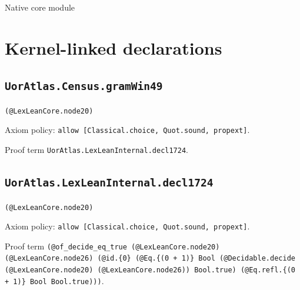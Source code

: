 \documentclass[11pt]{article}
\begin{document}
\begin{center}{\LARGE Native core module}\end{center}
\section*{Kernel-linked declarations}
\subsection*{\texttt{UorAtlas.Census.gramWin49}}
\noindent\texttt{(@LexLeanCore.node20)}\par
\noindent Axiom policy: \texttt{allow [Classical.choice, Quot.sound, propext]}.\par
\noindent Proof term \texttt{UorAtlas.LexLeanInternal.decl1724}.\par
\subsection*{\texttt{UorAtlas.LexLeanInternal.decl1724}}
\noindent\texttt{(@LexLeanCore.node20)}\par
\noindent Axiom policy: \texttt{allow [Classical.choice, Quot.sound, propext]}.\par
\noindent Proof term \texttt{(@of\_decide\_eq\_true (@LexLeanCore.node20) (@LexLeanCore.node26) (@id.\{0\} (@Eq.\{(0 + 1)\} Bool (@Decidable.decide (@LexLeanCore.node20) (@LexLeanCore.node26)) Bool.true) (@Eq.refl.\{(0 + 1)\} Bool Bool.true)))}.\par
\end{document}

